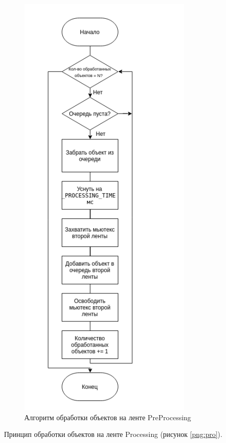        \begin{figure}[h!]
            \centering
            \includegraphics[scale=0.8]{pre.png}
\caption{Алгоритм обработки объектов на ленте PreProcessing}
            \label{png:pre}
        \end{figure} 

Принцип обработки объектов на ленте Processing (рисунок \ref{png:pro}).

